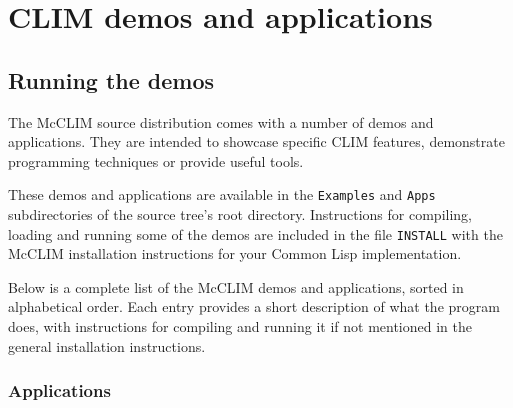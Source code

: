 \chapter{CLIM demos and applications}

\section{Running the demos}

The McCLIM source distribution comes with a number of demos and
applications.  They are intended to showcase specific CLIM features,
demonstrate programming techniques or provide useful tools.

These demos and applications are available in the \texttt{Examples}
and \texttt{Apps} subdirectories of the source tree's root directory.
Instructions for compiling, loading and running some of the demos are
included in the file \texttt{INSTALL} with the McCLIM installation
instructions for your Common Lisp implementation.

Below is a complete list of the McCLIM demos and applications, sorted in
alphabetical order.  Each entry provides a short description of what the
program does, with instructions for compiling and running it if not
mentioned in the general installation instructions.

\subsection{Applications}

